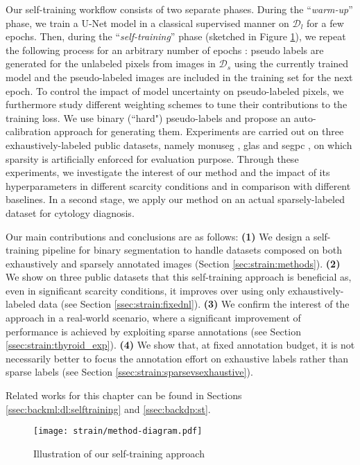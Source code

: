 Our self-training workflow consists of two separate phases. During the ``\textit{warm-up}'' phase, we train a U-Net \cite{ronneberger2015unet} model in a classical supervised manner on $\mathcal{D}_l$ for a few epochs. Then, during the ``\textit{self-training}'' phase (sketched in Figure \ref{fig:strain:method_diagram}), we repeat the following process for an arbitrary number of epochs : pseudo labels are generated for the unlabeled pixels from images in $\mathcal{D}_s$ using the currently trained model and the pseudo-labeled images are included in the training set for the next epoch. To control the impact of model uncertainty on pseudo-labeled pixels, we furthermore study different weighting schemes to tune their contributions to the training loss. We use binary (``hard") pseudo-labels and propose an auto-calibration approach for generating them. Experiments are carried out on three exhaustively-labeled public datasets, namely \acrshort{monuseg} \cite{kumar2019multi}, \acrshort{glas} \cite{sirinukunwattana2017gland} and \acrshort{segpc} \cite{gupta2021segpc}, on which sparsity is artificially enforced for evaluation purpose. Through these experiments, we investigate the interest of our method and the impact of its hyperparameters in different scarcity conditions and in comparison with different baselines. In a second stage, we apply our method on an actual sparsely-labeled dataset for cytology diagnosis.

Our main contributions and conclusions are as follows: \textbf{(1)} We design a self-training pipeline for binary segmentation to handle datasets composed on both exhaustively and sparsely annotated images (Section \ref{sec:strain:methods}). \textbf{(2)} We show on three public datasets that this self-training approach is beneficial as, even in significant scarcity conditions, it improves over using only exhaustively-labeled data (see Section \ref{ssec:strain:fixednl}). \textbf{(3)} We confirm the interest of the approach in a real-world scenario, where a significant improvement of performance is achieved by exploiting sparse annotations (see Section \ref{ssec:strain:thyroid_exp}). \textbf{(4)} We show that, at fixed annotation budget, it is not necessarily better to focus the annotation effort on exhaustive labels rather than sparse labels (see Section \ref{ssec:strain:sparsevsexhaustive}).

Related works for this chapter can be found in Sections \ref{ssec:backml:dl:selftraining} and \ref{ssec:backdp:st}.

\begin{figure}
  \centering
  \texttt{[image: strain/method-diagram.pdf]}
  \caption{Illustration of our self-training approach}
  \label{fig:strain:method_diagram}
\end{figure}

